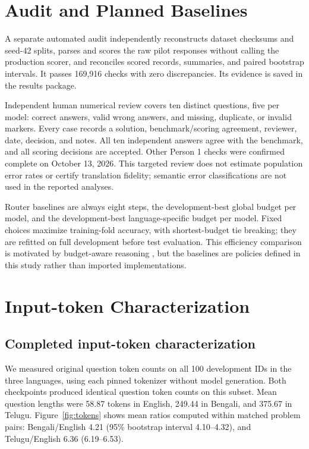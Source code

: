 \documentclass[11pt]{article}
\begin{document}
\section{Audit and Planned Baselines}
A separate automated audit independently reconstructs dataset checksums and seed-42 splits, parses and scores the raw pilot responses without calling the production scorer, and reconciles scored records, summaries, and paired bootstrap intervals. It passes 169,916 checks with zero discrepancies. Its evidence is saved in the results package.

Independent human numerical review covers ten distinct questions, five per model: correct answers, valid wrong answers, and missing, duplicate, or invalid markers. Every case records a solution, benchmark/scoring agreement, reviewer, date, decision, and notes. All ten independent answers agree with the benchmark, and all scoring decisions are accepted. Other Person 1 checks were confirmed complete on October 13, 2026. This targeted review does not estimate population error rates or certify translation fidelity; semantic error classifications are not used in the reported analyses.

Router baselines are always eight steps, the development-best global budget per model, and the development-best language-specific budget per model. Fixed choices maximize training-fold accuracy, with shortest-budget tie breaking; they are refitted on full development before test evaluation. This efficiency comparison is motivated by budget-aware reasoning \citep{han2025tale}, but the baselines are policies defined in this study rather than imported implementations.

\section{Input-token Characterization}
\subsection{Completed input-token characterization}
We measured original question token counts on all 100 development IDs in the three languages, using each pinned tokenizer without model generation. Both checkpoints produced identical question token counts on this subset. Mean question lengths were 58.87 tokens in English, 249.44 in Bengali, and 375.67 in Telugu. Figure~\ref{fig:tokens} shows mean ratios computed within matched problem pairs: Bengali/English 4.21 (95\% bootstrap interval 4.10--4.32), and Telugu/English 6.36 (6.19--6.53).
\end{document}
